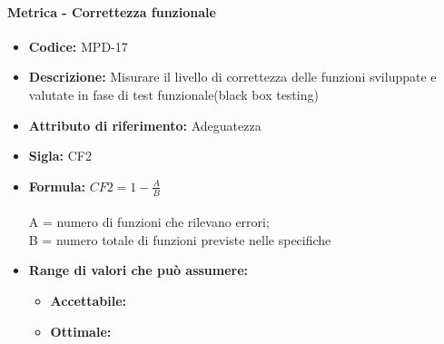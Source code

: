                \paragraph{Metrica - Correttezza funzionale} 
            \begin{itemize}
           \item   \textbf{Codice:} MPD-17
           \item   \textbf{Descrizione:} Misurare il livello di correttezza delle funzioni sviluppate e valutate in fase di test funzionale(black box testing) 
            \item  \textbf{Attributo di riferimento:} Adeguatezza
            \item  \textbf{Sigla:} CF2
           \item   \textbf{Formula:} \begin{math}CF2 = 1- \frac{A}{B}\end{math}\\ \\
            A = numero di funzioni che rilevano errori;\\
            B = numero totale di funzioni previste nelle specifiche
            \item \textbf{Range di valori che può assumere:}
        \begin{itemize}
            \item \textbf{Accettabile:} 
            \item \textbf{Ottimale:} 
        \end{itemize}
       \end{itemize}
       
